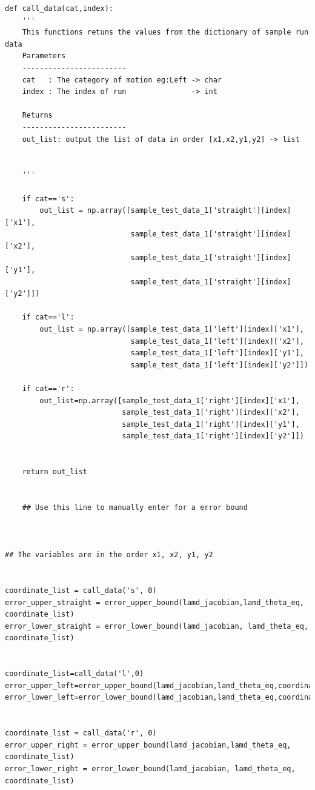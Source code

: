{\begin{itemize}
\begin{verbatim}
def call_data(cat,index):
    '''
    This functions retuns the values from the dictionary of sample run data
    Parameters
    ------------------------
    cat   : The category of motion eg:Left -> char
    index : The index of run               -> int
    
    Returns
    ------------------------
    out_list: output the list of data in order [x1,x2,y1,y2] -> list
    
    
    '''
    
    if cat=='s':
        out_list = np.array([sample_test_data_1['straight'][index]['x1'],
                             sample_test_data_1['straight'][index]['x2'],
                             sample_test_data_1['straight'][index]['y1'],
                             sample_test_data_1['straight'][index]['y2']])
        
    if cat=='l':
        out_list = np.array([sample_test_data_1['left'][index]['x1'],
                             sample_test_data_1['left'][index]['x2'],
                             sample_test_data_1['left'][index]['y1'],
                             sample_test_data_1['left'][index]['y2']])
        
    if cat=='r':
        out_list=np.array([sample_test_data_1['right'][index]['x1'],
                           sample_test_data_1['right'][index]['x2'],
                           sample_test_data_1['right'][index]['y1'],
                           sample_test_data_1['right'][index]['y2']])
    
    
    return out_list
    
    
    ## Use this line to manually enter for a error bound



## The variables are in the order x1, x2, y1, y2


coordinate_list = call_data('s', 0)
error_upper_straight = error_upper_bound(lamd_jacobian,lamd_theta_eq, coordinate_list)
error_lower_straight = error_lower_bound(lamd_jacobian, lamd_theta_eq, coordinate_list)


coordinate_list=call_data('l',0)
error_upper_left=error_upper_bound(lamd_jacobian,lamd_theta_eq,coordinate_list)
error_lower_left=error_lower_bound(lamd_jacobian,lamd_theta_eq,coordinate_list)


coordinate_list = call_data('r', 0)
error_upper_right = error_upper_bound(lamd_jacobian,lamd_theta_eq, coordinate_list)
error_lower_right = error_lower_bound(lamd_jacobian, lamd_theta_eq, coordinate_list)



\end{verbatim}
\end{itemize}}
